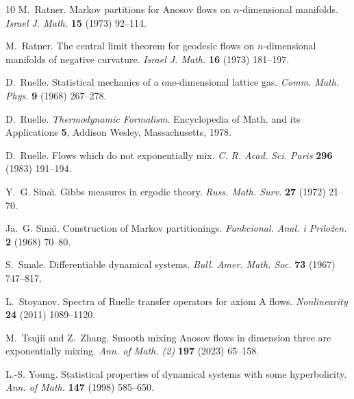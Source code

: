 \documentclass[12pt]{article}
\numberwithin{equation}{section}
\begin{document}
\begin{thebibliography}{10}
M.~Ratner. {Markov partitions for Anosov flows on $n$-dimensional manifolds}.
  \emph{Israel J. Math.} \textbf{15} (1973) 92--114.

M.~Ratner. {The central limit theorem for geodesic flows on $n$-dimensional
  manifolds of negative curvature}. \emph{Israel J. Math.} \textbf{16} (1973)
  181--197.

D.~Ruelle. Statistical mechanics of a one-dimensional lattice gas. \emph{Comm.
  Math. Phys.} \textbf{9} (1968) 267--278.

D.~Ruelle. \emph{{Thermodynamic Formalism}}. Encyclopedia of Math. and its
  Applications \textbf{5}, Addison Wesley, Massachusetts, 1978.

D.~Ruelle. {Flows which do not exponentially mix}. \emph{C. R. Acad. Sci.
  Paris} \textbf{296} (1983) 191--194.

Y.~G. Sina{\u\i}. {Gibbs measures in ergodic theory}. \emph{Russ. Math. Surv.}
  \textbf{27} (1972) 21--70.

Ja.~G. Sina\u{\i}. Construction of {M}arkov partitionings. \emph{Funkcional.
  Anal. i Prilo\v{z}en.} \textbf{2} (1968) 70--80.

S.~Smale. {Differentiable dynamical systems}. \emph{Bull. Amer. Math. Soc.}
  \textbf{73} (1967) 747--817.

L.~Stoyanov. Spectra of {R}uelle transfer operators for axiom {A} flows.
  \emph{Nonlinearity} \textbf{24} (2011) 1089--1120.

M.~Tsujii and Z.~Zhang. Smooth mixing {A}nosov flows in dimension three are
  exponentially mixing. \emph{Ann. of Math. (2)} \textbf{197} (2023) 65--158.

L.-S. Young. Statistical properties of dynamical systems with some
  hyperbolicity. \emph{Ann. of Math.} \textbf{147} (1998) 585--650.

\end{thebibliography}
\end{document}
